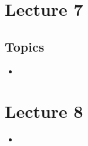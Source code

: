 \documentclass[a4paper]{report}
\begin{document}
\section{Lecture 7}

\subsection{Topics}

\begin{itemize}
    \item
\end{itemize}


\section{Lecture 8}

\begin{itemize}
    \item 
\end{itemize}
\end{document}
